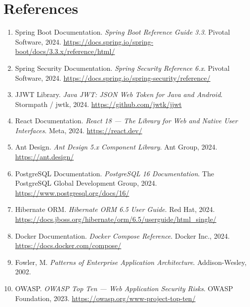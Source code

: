 \documentclass[12pt,a4paper]{report}
\begin{document}
\chapter*{References}

\begin{enumerate}
  \item Spring Boot Documentation. \textit{Spring Boot Reference Guide 3.3}.
        Pivotal Software, 2024. \url{https://docs.spring.io/spring-boot/docs/3.3.x/reference/html/}

  \item Spring Security Documentation. \textit{Spring Security Reference 6.x}.
        Pivotal Software, 2024. \url{https://docs.spring.io/spring-security/reference/}

  \item JJWT Library. \textit{Java JWT: JSON Web Token for Java and Android}.
        Stormpath / jwtk, 2024. \url{https://github.com/jwtk/jjwt}

  \item React Documentation. \textit{React 18 — The Library for Web and Native User Interfaces}.
        Meta, 2024. \url{https://react.dev/}

  \item Ant Design. \textit{Ant Design 5.x Component Library}.
        Ant Group, 2024. \url{https://ant.design/}

  \item PostgreSQL Documentation. \textit{PostgreSQL 16 Documentation}.
        The PostgreSQL Global Development Group, 2024. \url{https://www.postgresql.org/docs/16/}

  \item Hibernate ORM. \textit{Hibernate ORM 6.5 User Guide}.
        Red Hat, 2024. \url{https://docs.jboss.org/hibernate/orm/6.5/userguide/html_single/}

  \item Docker Documentation. \textit{Docker Compose Reference}.
        Docker Inc., 2024. \url{https://docs.docker.com/compose/}

  \item Fowler, M. \textit{Patterns of Enterprise Application Architecture}.
        Addison-Wesley, 2002.

  \item OWASP. \textit{OWASP Top Ten — Web Application Security Risks}.
        OWASP Foundation, 2023. \url{https://owasp.org/www-project-top-ten/}
\end{enumerate}
\end{document}
